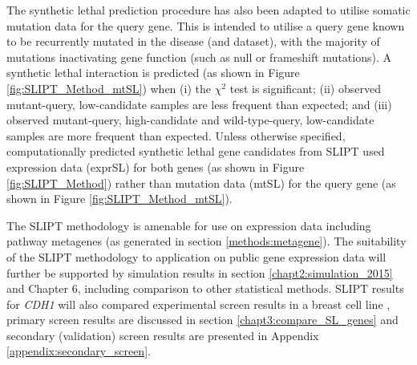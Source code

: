 The synthetic lethal prediction procedure has also been adapted to utilise somatic mutation data for the query gene. This is intended to utilise a query gene known to be recurrently mutated in the disease (and dataset), with the majority of mutations inactivating gene function (such as null or frameshift mutations). A synthetic lethal interaction is predicted  (as shown in Figure \ref{fig:SLIPT_Method_mtSL}) when (i) the $\chi^2$ test is significant; (ii) observed mutant-query, low-candidate samples are less frequent than expected; and (iii) observed mutant-query, high-candidate and wild-type-query, low-candidate samples are more frequent than expected. Unless otherwise specified, computationally predicted synthetic lethal gene candidates from SLIPT used expression data (exprSL) for both genes (as shown in Figure \ref{fig:SLIPT_Method}) rather than mutation data (mtSL) for the query gene (as shown in Figure \ref{fig:SLIPT_Method_mtSL}).

\begin{figure*}[!tb]
\begin{mdframed}
  \begin{center}
  \resizebox{0.8 \textwidth}{!}{
    \fbox{}
   }
   \end{center}
   \caption[Synthetic lethal prediction adapted for mutation]{\small \textbf{Synthetic lethal prediction adapted for mutation.} Synthetic Lethal Interaction Prediction Tool (SLIPT) was also adapted to identify candidate interacting genes using (somatic) mutation data of the query gene in the $\chi^2$ test. Samples are sorted into low, medium, and high expression quantiles for each candidate gene and tested for a directional shift against mutation status of the query gene. A sample having low expression or mutation for the synthetic lethal pair is expected to be unlikely with a corresponding increase in frequency of sample with mutant-high or wild-type-low gene pairs. Synthetic lethal candidate (mtSL) partners of a gene are identified by running this procedure on all possible partner genes, selecting those with an FDR-adjusted $\chi^2$ p-value of $p < 0.05$, and meeting the directional criteria. %
}
\label{fig:SLIPT_Method_mtSL}
\end{mdframed}
\end{figure*}

The SLIPT methodology is amenable for use on expression data including pathway metagenes (as generated in section \ref{methods:metagene}). The suitability of the SLIPT methodology to application on public gene expression data will further be supported by simulation results in section \ref{chapt2:simulation_2015} and Chapter 6, including comparison to other statistical methods. SLIPT results for \textit{CDH1} will also compared experimental screen results in a breast cell line \citep{Telford2015}, primary screen results are discussed in section \ref{chapt3:compare_SL_genes} and secondary (validation) screen results are presented in Appendix \ref{appendix:secondary_screen}.

